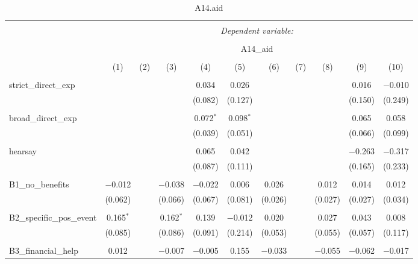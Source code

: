 
\begin{table}[H] \centering 
  \caption{A14.aid} 
  \label{} 
\tiny 
\begin{tabular}{@{\extracolsep{4pt}}lcccccccccc} 
\\[-1.8ex]\hline 
\hline \\[-1.8ex] 
 & \multicolumn{10}{c}{\textit{Dependent variable:}} \\ 
\cline{2-11} 
\\[-1.8ex] & \multicolumn{10}{c}{A14\_aid} \\ 
\\[-1.8ex] & (1) & (2) & (3) & (4) & (5) & (6) & (7) & (8) & (9) & (10)\\ 
\hline \\[-1.8ex] 
 strict\_direct\_exp &  &  &  & 0.034 & 0.026 &  &  &  & 0.016 & $-$0.010 \\ 
  &  &  &  & (0.082) & (0.127) &  &  &  & (0.150) & (0.249) \\ 
  & & & & & & & & & & \\ 
 broad\_direct\_exp &  &  &  & 0.072$^{*}$ & 0.098$^{*}$ &  &  &  & 0.065 & 0.058 \\ 
  &  &  &  & (0.039) & (0.051) &  &  &  & (0.066) & (0.099) \\ 
  & & & & & & & & & & \\ 
 hearsay &  &  &  & 0.065 & 0.042 &  &  &  & $-$0.263 & $-$0.317 \\ 
  &  &  &  & (0.087) & (0.111) &  &  &  & (0.165) & (0.233) \\ 
  & & & & & & & & & & \\ 
 B1\_no\_benefits & $-$0.012 &  & $-$0.038 & $-$0.022 & 0.006 & 0.026 &  & 0.012 & 0.014 & 0.012 \\ 
  & (0.062) &  & (0.066) & (0.067) & (0.081) & (0.026) &  & (0.027) & (0.027) & (0.034) \\ 
  & & & & & & & & & & \\ 
 B2\_specific\_pos\_event & 0.165$^{*}$ &  & 0.162$^{*}$ & 0.139 & $-$0.012 & 0.020 &  & 0.027 & 0.043 & 0.008 \\ 
  & (0.085) &  & (0.086) & (0.091) & (0.214) & (0.053) &  & (0.055) & (0.057) & (0.117) \\ 
  & & & & & & & & & & \\ 
 B3\_financial\_help & 0.012 &  & $-$0.007 & $-$0.005 & 0.155 & $-$0.033 &  & $-$0.055 & $-$0.062 & $-$0.017 \\ 

\end{tabular}
\end{table}
